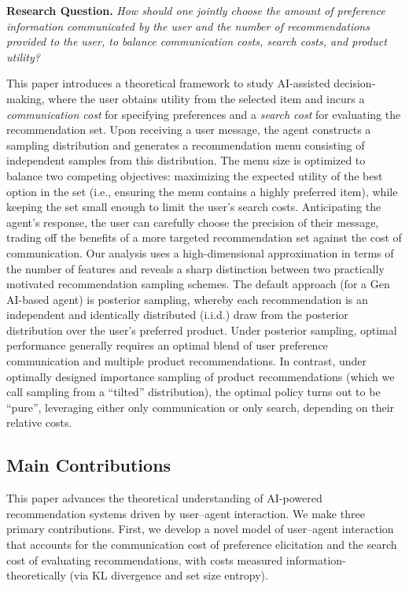 \documentclass[12pt]{article}
\theoremstyle{definition}
\theoremstyle{remark}
\begin{document}
\smallskip
\noindent\textbf{Research Question.} \emph{How should one jointly choose the amount of preference information communicated by the user and the number of recommendations provided to the user, to balance communication costs, search costs, and product utility?}
\smallskip

This paper introduces a theoretical framework to study AI-assisted decision-making, where the user obtains utility from the selected item and incurs a \textit{communication cost} for specifying preferences and a \textit{search cost} for evaluating the recommendation set. Upon receiving a user message, the agent constructs a sampling distribution and generates a recommendation menu consisting of independent samples from this distribution. The menu size is optimized to balance two competing objectives: maximizing the expected utility of the best option in the set (i.e., ensuring the menu contains a highly preferred item), while keeping the set small enough to limit the user's search costs. Anticipating the agent’s response, the user can carefully choose the precision of their message, trading off the benefits of a more targeted recommendation set against the cost of communication. Our analysis uses a high-dimensional approximation in terms of the number of features and reveals a sharp distinction between two practically motivated recommendation sampling schemes. The default approach (for a Gen AI-based agent) is posterior sampling, whereby each recommendation is an independent and identically distributed (i.i.d.) draw from the posterior distribution over the user’s preferred product. Under posterior sampling, optimal performance generally requires an optimal blend of user preference communication and multiple product recommendations. In contrast, under optimally designed importance sampling of product recommendations (which we call sampling from a ``tilted'' distribution), the optimal policy turns out to be ``pure'', leveraging either only communication or only search, depending on their relative costs.

\subsection{Main Contributions}
This paper advances the theoretical understanding of AI-powered recommendation systems driven by user–agent interaction. We make three primary contributions. First, we develop a novel model of user–agent interaction that accounts for the communication cost of preference elicitation and the search cost of evaluating recommendations, with costs measured information-theoretically (via KL divergence and set size entropy).
\end{document}
